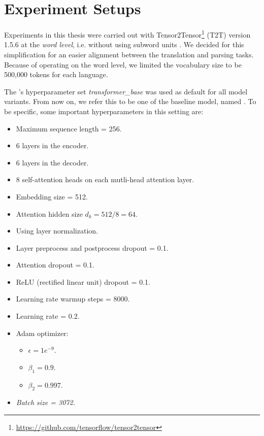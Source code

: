 \section{Experiment Setups}
\label{dataexp-exp}

Experiments in this thesis were carried out with Tensor2Tensor\footnote{\url{https://github.com/tensorflow/tensor2tensor}} (T2T) version 1.5.6 at the
\emph{word level}, i.e. without using subword units \citep{sennrich2015neural}.
We decided for this simplification for an easier alignment between the translation and parsing tasks.
Because of operating on the word level, we limited the vocabulary size to be 500,000 tokens for each language.

The \transformer's hyperparameter set \textit{transformer\_base} \citep{TrainingTipsfortheTransformerModel} was used as default for all model variants.
From now on, we refer this to be one of the baseline model, named \transformerbase. To be specific, some important hyperparameters in this setting are:

\begin{itemize}
    \item Maximum sequence length = 256.
    \item 6 layers in the encoder.
    \item 6 layers in the decoder.
    \item 8 self-attention heads on each mutli-head attention layer.
    \item Embedding size = 512.
    \item Attention hidden size $d_k=512/8=64$.
    \item Using layer normalization.
    \item Layer preprocess and postprocess dropout = 0.1.
    \item Attention dropout = 0.1.
    \item ReLU (rectified linear unit) dropout = 0.1.
    \item Learning rate warmup steps = 8000.
    \item Learning rate = 0.2.
    \item Adam optimizer:
        \begin{itemize}
            \item $\epsilon = 1e^{-9}$.
            \item $\beta_1 = 0.9$.
            \item $\beta_2 = 0.997$.
        \end{itemize}
    \item \textit{Batch size = 3072.}
\end{itemize}

